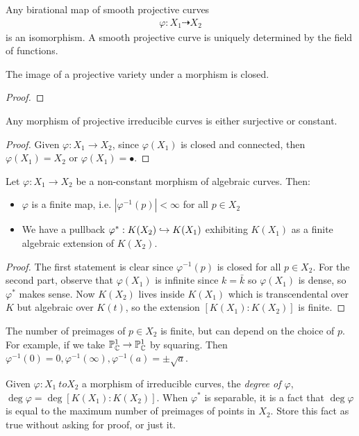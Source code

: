 \documentclass[10pt,a4paper,rgb]{article}
\begin{document}
\begin{corollary}
Any birational map of smooth projective curves
\begin{align*}
\varphi: X_1 \dashrightarrow X_2
\end{align*}
is an isomorphism. A smooth projective curve is uniquely determined by the field of functions. 
\end{corollary}
\begin{theorem}
The image of a projective variety under a morphism is closed.
\end{theorem}
\begin{proof}
\google
\end{proof}
\begin{corollary}
Any morphism of projective irreducible curves is either surjective or constant.
\end{corollary}
\begin{proof}
Given $\varphi:X_1\to X_2$, since $\varphi(X_1)$ is closed and connected, then $\varphi(X_1) = X_2$ or $\varphi(X_1) = \bullet$.
\end{proof}
\begin{proposition}
Let $\varphi:X_1 \to X_2$ be a non-constant morphism of algebraic curves. Then:
\begin{itemize}
\item $\varphi$ is a finite map, i.e. $|\varphi^{-1}(p)|<\infty$ for all $p \in X_2$
\item We have a pullback $\varphi^\ast:K(X_2)\hookrightarrow K(X_1)$ exhibiting $K(X_1)$ as a finite algebraic extension of $K(X_2)$.
\end{itemize}
\end{proposition}
\begin{proof}
The first statement is clear since $\varphi^{-1}(p)$ is closed for all $p \in X_2$. For the second part, observe that $\varphi(X_1)$ is infinite since $k = \bar{k}$ so $\varphi(X_1)$ is dense, so $\varphi^\ast$ makes sense. Now $K(X_2)$ lives inside $K(X_1)$ which is transcendental over $K$ but algebraic over $K(t)$, so the extension $[K(X_1):K(X_2)]$ is finite.
\end{proof}
The number of preimages of $p \in X_2$ is finite, but can depend on the choice of $p$. For example, if we take $\mathbb{P}^1_{\mathbb{C}} \to \mathbb{P}^1_{\mathbb{C}}$ by squaring. Then $\varphi^{-1}(0) = 0, \varphi^{-1}(\infty), \varphi^{-1}(a) = \pm \sqrt{a}$.

Given $\varphi:X_1\ to X_2$ a morphism of irreducible curves, the \emph{degree of $\varphi$}, $\deg \varphi = \deg[K(X_1):K(X_2)]$. When $\varphi^\ast$ is separable, it is a fact that $\deg \varphi$ is equal to the maximum number of preimages of points in $X_2$. Store this fact as true without asking for proof, or just \google it.
\end{document}

